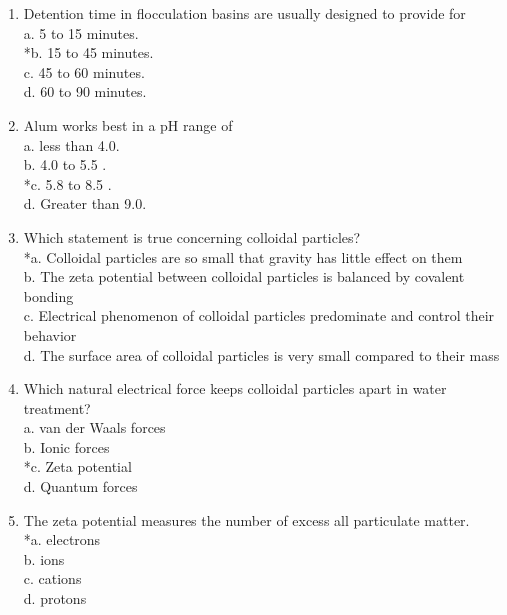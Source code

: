 \begin{enumerate}
 \item Detention time in flocculation basins are usually designed to provide for\\
a. 5 to 15 minutes.\\
*b. 15 to 45 minutes.\\
c. 45 to 60 minutes.\\
d. 60 to 90 minutes.\\
  \item Alum works best in a pH range of\\
a. less than 4.0.\\
b. 4.0 to 5.5 .\\
*c. 5.8 to 8.5 .\\
d. Greater than 9.0.\\
  \item Which statement is true concerning colloidal particles?\\
*a. Colloidal particles are so small that gravity has little effect on them\\
b. The zeta potential between colloidal particles is balanced by covalent bonding\\
c. Electrical phenomenon of colloidal particles predominate and control their behavior\\
d. The surface area of colloidal particles is very small compared to their mass\\
  \item Which natural electrical force keeps colloidal particles apart in water treatment?\\
a. van der Waals forces\\
b. Ionic forces\\
*c. Zeta potential\\
d. Quantum forces\\
  \item The zeta potential measures the number of excess all particulate matter.\\
*a. electrons\\
b. ions\\
c. cations\\
d. protons\\
\end{enumerate}
